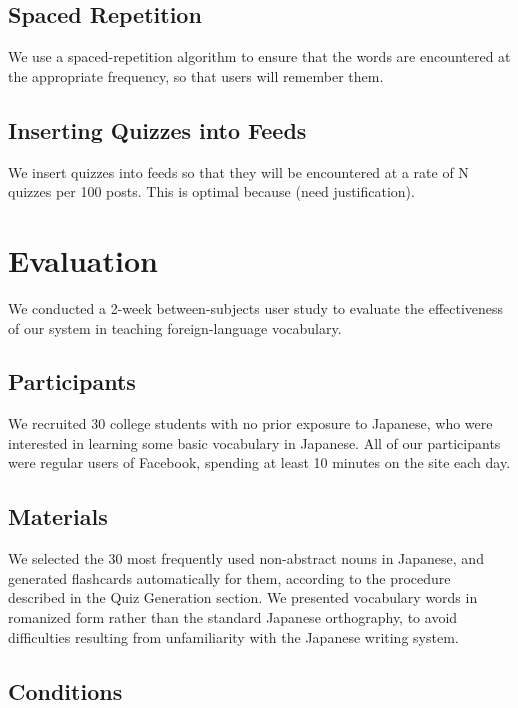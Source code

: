\documentclass{sigchi}
\begin{document}
\subsection{Spaced Repetition}

We use a spaced-repetition algorithm to ensure that the words are encountered at the appropriate frequency, so that users will remember them.

\subsection{Inserting Quizzes into Feeds}

We insert quizzes into feeds so that they will be encountered at a rate of N quizzes per 100 posts. This is optimal because (need justification).

\section{Evaluation}

We conducted a 2-week between-subjects user study to evaluate the effectiveness of our system in teaching foreign-language vocabulary.

\subsection{Participants}

We recruited 30 college students with no prior exposure to Japanese, who were interested in learning some basic vocabulary in Japanese. All of our participants were regular users of Facebook, spending at least 10 minutes on the site each day.

\subsection{Materials}

We selected the 30 most frequently used non-abstract nouns in Japanese, and generated flashcards automatically for them, according to the procedure described in the Quiz Generation section. We presented vocabulary words in romanized form rather than the standard Japanese orthography, to avoid difficulties resulting from unfamiliarity with the Japanese writing system.

\subsection{Conditions}
\end{document}
